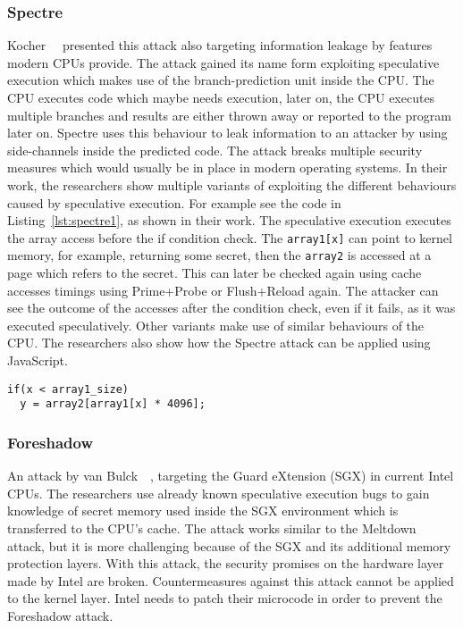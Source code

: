 \subsubsection{Spectre}

Kocher~\etal~\cite{spectre} presented this attack also targeting information
leakage by features modern CPUs provide. The attack gained its name form
exploiting speculative execution which makes use of the branch-prediction unit
inside the CPU. The CPU executes code which maybe needs execution, later on,
the CPU executes multiple branches and results are either thrown away or
reported to the program later on. Spectre uses this behaviour to leak
information to an attacker by using side-channels inside the predicted code.
The attack breaks multiple security measures which would usually be in place in
modern operating systems. In their work, the researchers show multiple variants
of exploiting the different behaviours caused by speculative execution. For
example see the code in Listing~\ref{lst:spectre1}, as shown in their work. The
speculative execution executes the array access before the if condition check.
The \texttt{array1[x]} can point to kernel memory, for example, returning some
secret, then the \texttt{array2} is accessed at a page which refers to the
secret. This can later be checked again using cache accesses timings using
Prime+Probe or Flush+Reload again. The attacker can see the outcome of the
accesses after the condition check, even if it fails, as it was executed
speculatively. Other variants make use of similar behaviours of the CPU. The
researchers also show how the Spectre attack can be applied using JavaScript.

\begin{minipage}{\linewidth}
\begin{lstlisting}[style=CStyle,
                   caption={Code for Spectre variant one, showing a
conditional branch example, as seen by the work done by
Kocher~\etal~\cite{spectre}.},
                   label={lst:spectre1}]
if(x < array1_size)
  y = array2[array1[x] * 4096];
\end{lstlisting}
\end{minipage}

\subsubsection{Foreshadow}

An attack by van Bulck~\etal~\cite{foreshadow}, targeting the Guard eXtension
(SGX) in current Intel CPUs. The researchers use already known speculative
execution bugs to gain knowledge of secret memory used inside the SGX
environment which is transferred to the CPU's cache. The attack works similar
to the Meltdown attack, but it is more challenging because of the SGX and its
additional memory protection layers. With this attack, the security promises on
the hardware layer made by Intel are broken. Countermeasures against this
attack cannot be applied to the kernel layer. Intel needs to patch their
microcode in order to prevent the Foreshadow attack.

